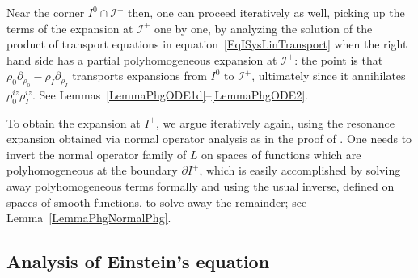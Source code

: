 \documentclass[reqno,11pt,letterpaper]{amsart}
\numberwithin{equation}{section}
\numberwithin{figure}{section}
\theoremstyle{definition}
\theoremstyle{remark}
\newcommand{\ms}{\mathscr}
\newcommand{\scri}{\ms I}
\newcommand{\pa}{\partial}
\begin{document}
Near the corner $I^0\cap\scri^+$ then, one can proceed iteratively as well, picking up the terms of the expansion at $\scri^+$ one by one, by analyzing the solution of the product of transport equations in equation~\eqref{EqISysLinTransport} when the right hand side has a partial polyhomogeneous expansion at $\scri^+$: the point is that $\rho_0\pa_{\rho_0}-\rho_I\pa_{\rho_I}$ transports expansions from $I^0$ to $\scri^+$, ultimately since it annihilates $\rho_0^{i z}\rho_I^{i z}$. See Lemmas~\ref{LemmaPhgODE1d}--\ref{LemmaPhgODE2}.

To obtain the expansion at $I^+$, we argue iteratively again, using the resonance expansion obtained via normal operator analysis as in the proof of \cite[Theorem~2.21]{HintzVasySemilinear}. One needs to invert the normal operator family of $L$ on spaces of functions which are polyhomogeneous at the boundary $\pa I^+$, which is easily accomplished by solving away polyhomogeneous terms formally and using the usual inverse, defined on spaces of smooth functions, to solve away the remainder; see Lemma~\ref{LemmaPhgNormalPhg}.



\subsection{Analysis of Einstein's equation}
\label{SsIEin}
\end{document}

